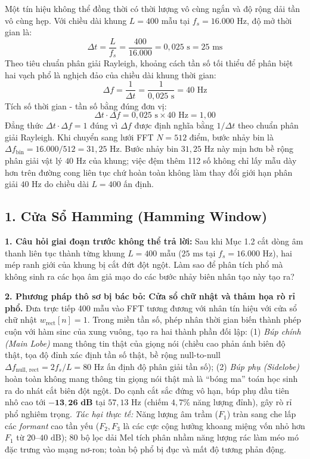 \documentclass[11pt,a4paper]{article}
\begin{document}
Một tín hiệu không thể đồng thời có thời lượng vô cùng ngắn và độ rộng dải tần vô cùng hẹp. Với chiều dài khung $L = 400$ mẫu tại $f_s = 16.000\text{ Hz}$, độ mở thời gian là:
\[
\Delta t = \frac{L}{f_s} = \frac{400}{16.000} = 0{,}025\text{ s} = 25\text{ ms}
\]
Theo tiêu chuẩn phân giải Rayleigh, khoảng cách tần số tối thiểu để phân biệt hai vạch phổ là nghịch đảo của chiều dài khung thời gian:
\[
\Delta f = \frac{1}{\Delta t} = \frac{1}{0{,}025\text{ s}} = 40\text{ Hz}
\]
Tích số thời gian - tần số bằng đúng đơn vị:
\[
\Delta t \cdot \Delta f = 0{,}025\text{ s} \times 40\text{ Hz} = 1{,}00
\]
Đẳng thức $\Delta t \cdot \Delta f = 1$ đúng vì $\Delta f$ được định nghĩa bằng $1/\Delta t$ theo chuẩn phân giải Rayleigh. Khi chuyển sang lưới FFT $N = 512$ điểm, bước nhảy bin là $\Delta f_{\text{bin}} = 16.000 / 512 = 31{,}25\text{ Hz}$. Bước nhảy bin $31{,}25\text{ Hz}$ này mịn hơn bề rộng phân giải vật lý $40\text{ Hz}$ của khung; việc đệm thêm 112 số không chỉ lấy mẫu dày hơn trên đường cong liên tục chứ hoàn toàn không làm thay đổi giới hạn phân giải $40\text{ Hz}$ do chiều dài $L = 400$ ấn định.

\clearpage


\subsection*{1. Cửa Sổ Hamming (Hamming Window)}

\textbf{1. Câu hỏi giai đoạn trước không thể trả lời:} Sau khi Mục 1.2 cắt dòng âm thanh liên tục thành từng khung $L = 400$ mẫu ($25\text{ ms}$ tại $f_s = 16.000\text{ Hz}$), hai mép ranh giới của khung bị cắt đứt đột ngột. Làm sao để phân tích phổ mà không sinh ra các họa âm giả mạo do các bước nhảy biên nhân tạo này tạo ra?

\textbf{2. Phương pháp thô sơ bị bác bỏ: Cửa sổ chữ nhật và thảm họa rò rỉ phổ.} Đưa trực tiếp 400 mẫu vào FFT tương đương với nhân tín hiệu với cửa sổ chữ nhật $w_{\text{rect}}[n]=1$. Trong miền tần số, phép nhân thời gian biến thành phép cuộn với hàm sinc của xung vuông, tạo ra hai thành phần đối lập: (1) \textit{Búp chính (Main Lobe)} mang thông tin thật của giọng nói (chiều cao phản ánh biên độ thật, tọa độ đỉnh xác định tần số thật, bề rộng null-to-null $\Delta f_{\text{null, rect}} = 2f_s/L = 80\text{ Hz}$ ấn định độ phân giải tần số); (2) \textit{Búp phụ (Sidelobe)} hoàn toàn không mang thông tin giọng nói thật mà là ``bóng ma'' toán học sinh ra do nhát cắt biên đột ngột. Do cạnh cắt sắc đứng vô hạn, búp phụ đầu tiên nhô cao tới $\mathbf{-13{,}26\text{ dB}}$ tại $57{,}13\text{ Hz}$ (chiếm $4{,}7\%$ năng lượng đỉnh), gây rò rỉ phổ nghiêm trọng. \textit{Tác hại thực tế:} Năng lượng âm trầm ($F_1$) tràn sang che lấp các \textit{formant} cao tần yếu ($F_2, F_3$ là các cực cộng hưởng khoang miệng vốn nhỏ hơn $F_1$ từ $20\text{--}40\text{ dB}$); 80 bộ lọc dải Mel tích phân nhầm năng lượng rác làm méo mó đặc trưng vào mạng nơ-ron; toàn bộ phổ bị đục và mất độ tương phản động.
\end{document}
